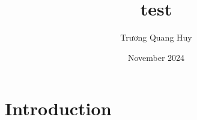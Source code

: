 \documentclass{article}
\title{test}
\author{Trương Quang Huy}
\date{November 2024}
\begin{document}
\maketitle

\section{Introduction}
\end{document}

